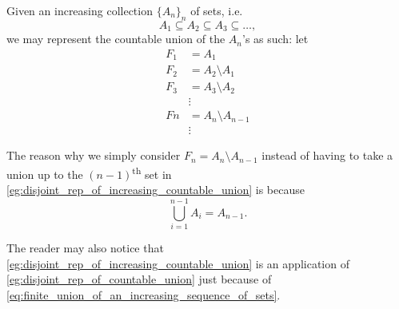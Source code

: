 \documentclass[notoc,notitlepage]{tufte-book}
\begin{document}
\begin{eg}\label{eg:disjoint_rep_of_increasing_countable_union}
  Given an increasing collection $\{ A_n \}_{n}$ of sets, i.e.
  \begin{equation*}
    A_1 \subseteq A_2 \subseteq A_3 \subseteq \hdots,
  \end{equation*}
  we may represent the countable union of the $A_n$'s as such:
  let
  \begin{align*}
    F_1 &= A_1 \\
    F_2 &= A_2 \setminus A_1 \\
    F_3 &= A_3 \setminus A_2 \\
        &\vdots \\
    Fn &= A_n \setminus A_{n-1} \\
       &\vdots
  \end{align*}
\end{eg}

\begin{remark}
  The reason why we simply consider $F_n = A_n \setminus A_{n-1}$ instead
  of having to take a union up to the $(n-1)$\textsuperscript{th}
  set in \cref{eg:disjoint_rep_of_increasing_countable_union}
  is because
  \begin{equation}\label{eq:finite_union_of_an_increasing_sequence_of_sets}
    \bigcup_{i=1}^{n-1} A_i = A_{n-1}.
  \end{equation}

  The reader may also notice that
  \cref{eg:disjoint_rep_of_increasing_countable_union}
  is an application of \cref{eg:disjoint_rep_of_countable_union}
  just because of \cref{eq:finite_union_of_an_increasing_sequence_of_sets}.
\end{remark}


\backmatter

\fancyhead[LE]{\thepage \enspace \textsl{\leftmark}}



\printindex
\end{document}

